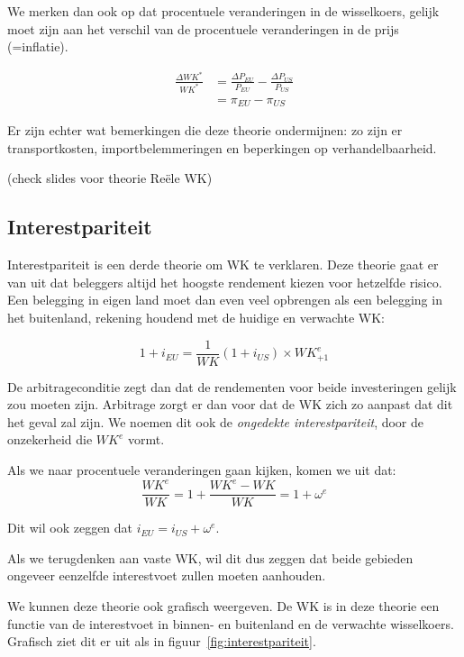 We merken dan ook op dat procentuele veranderingen in de wisselkoers, gelijk moet zijn aan het verschil van de procentuele veranderingen in de prijs (=inflatie).

\begin{align*}
  \frac{\Delta WK^*}{WK^*} &= \frac{\Delta P_{EU}}{P_{EU}}-\frac{\Delta P_{US}}{P_{US}}\\
  &= \pi_{EU} - \pi_{US}
\end{align*}

Er zijn echter wat bemerkingen die deze theorie ondermijnen: zo zijn er transportkosten, importbelemmeringen en beperkingen op verhandelbaarheid.

(check slides voor theorie Re\"ele WK)

\subsection{Interestpariteit}
Interestpariteit is een derde theorie om WK te verklaren. Deze theorie gaat er van uit dat beleggers altijd het hoogste rendement kiezen voor hetzelfde risico. Een belegging in eigen land moet dan even veel opbrengen als een belegging in het buitenland, rekening houdend met de huidige en verwachte WK:

\begin{equation}
  1 + i_{EU} = \frac{1}{WK} (1+i_{US}) \times WK^e_{+1}
\end{equation}

De arbitrageconditie zegt dan dat de rendementen voor beide investeringen gelijk zou moeten zijn. Arbitrage zorgt er dan voor dat de WK zich zo aanpast dat dit het geval zal zijn. We noemen dit ook de \textit{ongedekte interestpariteit}, door de onzekerheid die $WK^e$ vormt.

Als we naar procentuele veranderingen gaan kijken, komen we uit dat:
\begin{equation}
  \frac{WK^e}{WK} = 1 + \frac{WK^e -WK}{WK} = 1 + \omega^e
\end{equation}

Dit wil ook zeggen dat $i_{EU} = i_{US} + \omega^e$.

Als we terugdenken aan vaste WK, wil dit dus zeggen dat beide gebieden ongeveer eenzelfde interestvoet zullen moeten aanhouden.

We kunnen deze theorie ook grafisch weergeven. De WK is in deze theorie een functie van de interestvoet in binnen- en buitenland en de verwachte wisselkoers. Grafisch ziet dit er uit als in figuur~\ref{fig:interestpariteit}.

